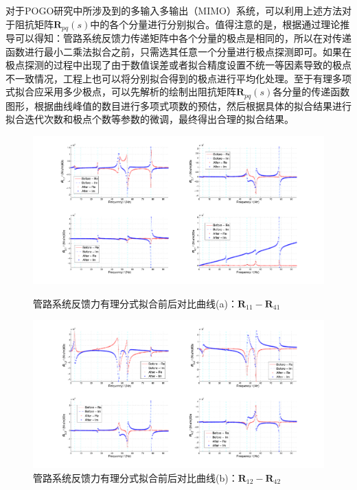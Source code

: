 对于POGO研究中所涉及到的多输入多输出（MIMO）系统，可以利用上述方法对于阻抗矩阵$\boldsymbol{R}_{pq}(s)$中的各个分量进行分别拟合。值得注意的是，根据通过理论推导可以得知：管路系统反馈力传递矩阵中各个分量的极点是相同的，所以在对传递函数进行最小二乘法拟合之前，只需选其任意一个分量进行极点探测即可。如果在极点探测的过程中出现了由于数值误差或者拟合精度设置不统一等因素导致的极点不一致情况，工程上也可以将分别拟合得到的极点进行平均化处理。至于有理多项式拟合应采用多少极点，可以先解析的绘制出阻抗矩阵$\boldsymbol{R}_{pq}(s)$各分量的传递函数图形，根据曲线峰值的数目进行多项式项数的预估，然后根据具体的拟合结果进行拟合迭代次数和极点个数等参数的微调，最终得出合理的拟合结果。

\begin{figure}[p]
  \centering
  \includegraphics[trim={4.5cm 0cm 4.5cm 0cm}, clip=true, width=\linewidth]{Fitted-Transfer-01.pdf}
  \caption{管路系统反馈力有理分式拟合前后对比曲线(a)：$\boldsymbol{R}_{11}-\boldsymbol{R}_{41}$}
  \label{Rational-Fitted-VS-01}
  \vspace{1.2em}
  \includegraphics[trim={4.5cm 0cm 4.5cm 0cm}, clip=true, width=\linewidth]{Fitted-Transfer-02.pdf}
  \caption{管路系统反馈力有理分式拟合前后对比曲线(b)：$\boldsymbol{R}_{12}-\boldsymbol{R}_{42}$}
  \label{Rational-Fitted-VS-02}
\end{figure}

